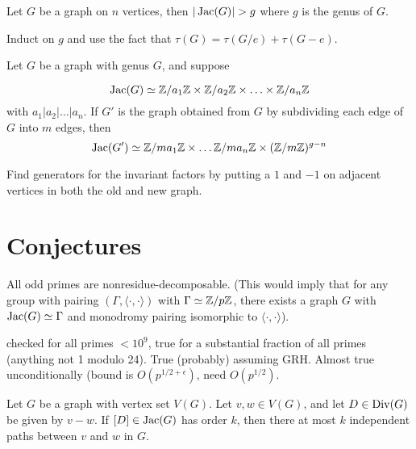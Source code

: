 \documentclass{amsart}
\newenvironment{proof_short}
{\emph{Proof idea:}}
\newenvironment{evidence}
{\emph{Evidence:}}
\begin{document}
\begin{fact}
  Let $G$ be a graph on $n$ vertices, then $|\Jac(G)|>g$ where $g$ is 
  the genus of $G$.
\end{fact}

\begin{proof_short}
  Induct on $g$ and use the fact that $\tau(G) = \tau(G/e) +
  \tau(G-e)$.  
\end{proof_short}


\begin{fact}
  Let $G$ be a graph with genus $G$, and suppose

  \begin{equation}
    \operatorname{Jac}(G) \simeq
    \mathbb{Z}/a_1\mathbb{Z} \times \mathbb{Z}/a_2\mathbb{Z} \times \ldots \times \mathbb{Z}/a_n\mathbb{Z}
  \end{equation}
  with $a_1 | a_2 | \ldots | a_n$. If $G'$ is the graph obtained from
  $G$ by subdividing each edge of $G$ into $m$ edges, then
  \begin{equation}
    \operatorname{Jac}(G') \simeq \mathbb{Z}/ma_1\mathbb{Z} \times \ldots \mathbb{Z}/ma_n\mathbb{Z}
    \times (\mathbb{Z}/m\mathbb{Z})^{g - n}
  \end{equation}
\end{fact}
\begin{proof_short}
  Find generators for the invariant factors by putting a $1$ and $-1$
  on adjacent vertices in both the old and new graph.
\end{proof_short}


\section{Conjectures}


\begin{conj}
  All odd primes are nonresidue-decomposable. (This would imply that
  for any group with pairing $(\Gamma, \langle \cdot , \cdot \rangle)$
  with $\Gamma \simeq \mathbb{Z}/p\mathbb{Z}$, there exists a graph $G$ with $\operatorname{Jac}(G)
  \simeq \Gamma$ and monodromy pairing isomorphic to $\langle \cdot,
  \cdot \rangle$).
\end{conj}
\begin{evidence}
  checked for all primes $ < 10^9$, true for a substantial fraction of
  all primes (anything not 1 modulo 24). True (probably) assuming
  GRH. Almost true unconditionally (bound is $O(p^{1/2 + \epsilon})$,
  need $O(p^{1/2})$.
\end{evidence}


\begin{conj}
  Let $G$ be a graph with vertex set $V(G)$. Let $v, w \in V(G)$, and
  let $D \in \operatorname{Div}(G)$ be given by $v - w$. If $[D] \in \operatorname{Jac}(G)$ has
  order $k$, then there at most $k$ independent paths between $v$ and
  $w$ in $G$.
\end{conj}
\end{document}
